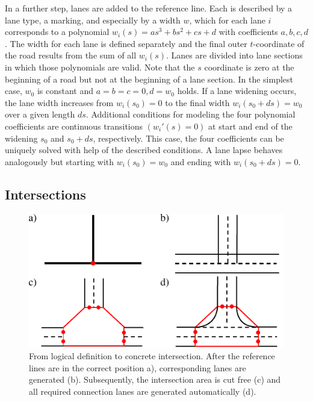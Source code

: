 \documentclass[a4paper, 10pt, conference]{ieeeconf}      %
\begin{document}
    In a further step, lanes are added to the reference line. Each is described by a lane type, a marking, and especially by a width $w$, which for each lane $i$ corresponds to a polynomial $w_i(s)=as^3 + bs^2 + cs + d$ with coefficients \(a,b,c,d\). The width for each lane is defined separately and the final outer $t$-coordinate of the road results from the sum of all $w_i(s)$. Lanes are divided into lane sections in which those polynomials are valid. Note that the $s$ coordinate is zero at the beginning of a road but not at the beginning of a lane section. In the simplest case, $w_0$ is constant and $a=b=c=0, d=w_0$ holds. If a lane widening occurs, the lane width increases from $w_i(s_0)=0$ to the final width $w_i(s_0+ds)=w_0$ over a given length $ds$. Additional conditions for modeling the four polynomial coefficients are continuous transitions \(\left(w_i'(s) = 0\right)\) at start and end of the widening $s_0$ and $s_0 + ds$, respectively. This case, the four coefficients can be uniquely solved with help of the described conditions. A lane lapse behaves analogously but starting with $w_i(s_0)=w_0$ and ending with $w_i(s_0+ds)=0$.
        
\subsection{Intersections}\label{sec_inters}
    \begin{figure}[tb]        
        \centering
        \includegraphics{fig/createJunction.pdf}
        \caption{From logical definition to concrete intersection. After the reference lines are in the correct position a), corresponding lanes are generated (b). Subsequently, the intersection area is cut free (c) and all required connection lanes are generated automatically (d).}
        \label{fig_createJunction}
    \end{figure}
	
\end{document}
